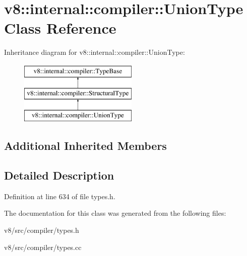 \hypertarget{classv8_1_1internal_1_1compiler_1_1UnionType}{}\section{v8\+:\+:internal\+:\+:compiler\+:\+:Union\+Type Class Reference}
\label{classv8_1_1internal_1_1compiler_1_1UnionType}
Inheritance diagram for v8\+:\+:internal\+:\+:compiler\+:\+:Union\+Type\+:\begin{figure}[H]
\begin{center}
\leavevmode
\includegraphics[height=3.000000cm]{classv8_1_1internal_1_1compiler_1_1UnionType}
\end{center}
\end{figure}
\subsection*{Additional Inherited Members}


\subsection{Detailed Description}


Definition at line 634 of file types.\+h.



The documentation for this class was generated from the following files\+:\begin{DoxyCompactItemize}
\item 
v8/src/compiler/types.\+h\item 
v8/src/compiler/types.\+cc\end{DoxyCompactItemize}
